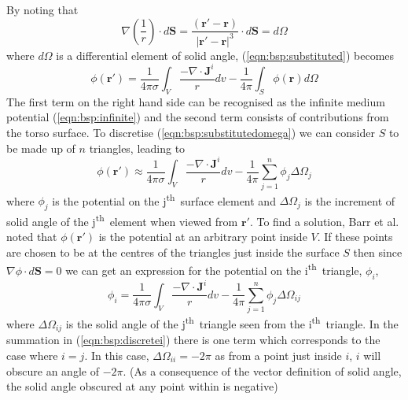 By noting that
\begin{equation}
\label{eqn:bsp:solidanglesubs}
\nabla\left(\frac{1}{r}\right) \cdot d\mathbf{S} =
\frac{\left(\mathbf{r'}-\mathbf{r}\right)}{|\mathbf{r'}-\mathbf{r}|^{3}} \cdot d\mathbf{S} =
d\Omega
\end{equation}
where $d\Omega$ is a differential element of solid angle,
(\ref{eqn:bsp:substituted}) becomes
\begin{equation}
\label{eqn:bsp:substitutedomega}
\phi\left(\mathbf{r'}\right) =
\frac{1}{4 \pi \sigma}\int_{V} \frac{-\nabla \cdot \mathbf{J}^{i}}{r}dv -
\frac{1}{4 \pi}\int_{S} \phi\left(\mathbf{r}\right)d\Omega
\end{equation}
The first term on the right hand side can be recognised as the infinite medium
potential (\ref{eqn:bsp:infinite}) and the second term consists of contributions
from the torso surface.
To discretise (\ref{eqn:bsp:substitutedomega}) we can consider $S$ to be made up of
$n$ triangles, leading to
\begin{equation}
\label{eqn:bsp:discrete}
\phi\left(\mathbf{r'}\right) \approx
\frac{1}{4 \pi \sigma}\int_{V} \frac{-\nabla \cdot \mathbf{J}^{i}}{r}dv -
\frac{1}{4 \pi}\sum_{j=1}^n \phi_{j}\Delta\Omega_{j}
\end{equation}
where $\phi_{j}$ is the potential on the j\textsuperscript{th}\ surface element
and $\Delta\Omega_{j}$ is the increment of solid angle of the
j\textsuperscript{th}\ element when viewed from $\mathbf{r'}$.
To find a solution, Barr et al. noted that $\phi\left(\mathbf{r'}\right)$ is the
potential at an arbitrary point inside $V$.
If these points are chosen to be at the centres of the triangles just inside
the surface $S$ then since $\nabla\phi \cdot d\mathbf{S} = 0$ we can get an
expression for the potential on the i\textsuperscript{th}\ triangle, $\phi_{i}$,
\begin{equation}
\label{eqn:bsp:discretei}
\phi_{i} =
\frac{1}{4 \pi \sigma}\int_{V} \frac{-\nabla \cdot \mathbf{J}^{i}}{r}dv -
\frac{1}{4 \pi}\sum_{j=1}^n \phi_{j}\Delta\Omega_{ij}
\end{equation}
where $\Delta\Omega_{ij}$ is the solid angle of the j\textsuperscript{th}\
triangle seen from the i\textsuperscript{th}\ triangle.
In the summation in (\ref{eqn:bsp:discretei}) there is one term which corresponds to
the case where $i = j$.
In this case, $\Delta\Omega_{ii} = -2\pi$ as from a point just inside $i$, $i$
will obscure an angle of $-2\pi$.  (As a consequence of the vector definition of
solid angle, the solid angle obscured at any point within is negative)

